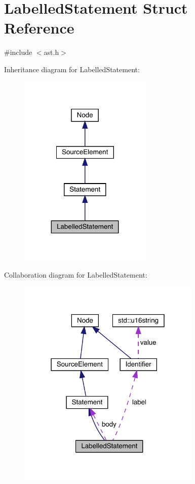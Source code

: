 \hypertarget{struct_labelled_statement}{}\section{Labelled\+Statement Struct Reference}
\label{struct_labelled_statement}


{\ttfamily \#include $<$ast.\+h$>$}



Inheritance diagram for Labelled\+Statement\+:\nopagebreak
\begin{figure}[H]
\begin{center}
\leavevmode
\includegraphics[width=179pt]{struct_labelled_statement__inherit__graph}
\end{center}
\end{figure}


Collaboration diagram for Labelled\+Statement\+:\nopagebreak
\begin{figure}[H]
\begin{center}
\leavevmode
\includegraphics[width=247pt]{struct_labelled_statement__coll__graph}
\end{center}
\end{figure}
